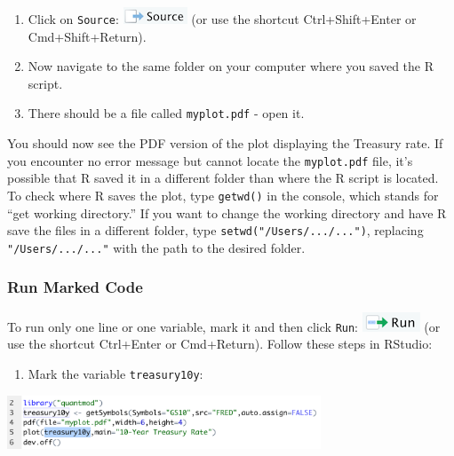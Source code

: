\documentclass[
]{book}
\providecommand{\tightlist}{%
  \setlength{\itemsep}{0pt}\setlength{\parskip}{0pt}}
\begin{document}
\begin{enumerate}
\def\labelenumi{\arabic{enumi}.}
\setcounter{enumi}{6}
\tightlist
\item
  Click on \texttt{Source}: \includegraphics{files/icons-rstudio/source.png} (or use the shortcut Ctrl+Shift+Enter or Cmd+Shift+Return).
\item
  Now navigate to the same folder on your computer where you saved the R script.
\item
  There should be a file called \texttt{myplot.pdf} - open it.
\end{enumerate}

You should now see the PDF version of the plot displaying the Treasury rate. If you encounter no error message but cannot locate the \texttt{myplot.pdf} file, it's possible that R saved it in a different folder than where the R script is located. To check where R saves the plot, type \texttt{getwd()} in the console, which stands for ``get working directory.'' If you want to change the working directory and have R save the files in a different folder, type \texttt{setwd("/Users/.../...")}, replacing \texttt{"/Users/.../..."} with the path to the desired folder.

\hypertarget{run-marked-code}{%
\subsubsection*{Run Marked Code}\label{run-marked-code}}

To run only one line or one variable, mark it and then click \texttt{Run}: \includegraphics{files/icons-rstudio/run.png} (or use the shortcut Ctrl+Enter or Cmd+Return). Follow these steps in RStudio:

\begin{enumerate}
\def\labelenumi{\arabic{enumi}.}
\setcounter{enumi}{9}
\tightlist
\item
  Mark the variable \texttt{treasury10y}:
\end{enumerate}

\includegraphics[width=0.7\textwidth,height=\textheight]{files/icons-rstudio/markvariable.png}
\end{document}

